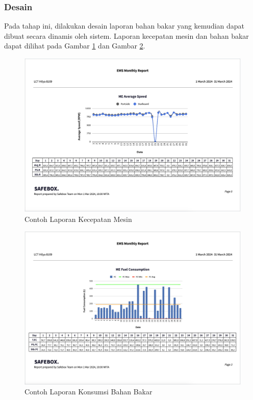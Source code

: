 \subsubsection{Desain}

Pada tahap ini, dilakukan desain laporan bahan bakar yang kemudian dapat dibuat secara dinamis oleh sistem. Laporan kecepatan mesin dan bahan bakar dapat dilihat pada Gambar \ref{fig:es-report} dan Gambar \ref{fig:fc-report}.

\begin{figure}[!h]
    \includegraphics[width=1\linewidth, center]{images/hasil/iterations/4/es-report.png}
    \caption{Contoh Laporan Kecepatan Mesin}
    \label{fig:es-report}
\end{figure}

\begin{figure}[!h]
    \includegraphics[width=1\linewidth, center]{images/hasil/iterations/4/fc-report.png}
    \caption{Contoh Laporan Konsumsi Bahan Bakar}
    \label{fig:fc-report}
\end{figure}

